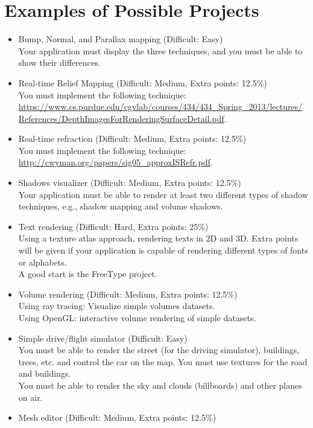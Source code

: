 \documentclass[11pt]{article}
\begin{document}
\section{Examples of Possible Projects}
\begin{itemize}
\item Bump, Normal, and Parallax mapping (Difficult: Easy)\\
Your application must display the three techniques, and you must be able to show their differences.
\item Real-time Relief Mapping (Difficult: Medium, Extra points: 12.5\%)\\
You must implement the following technique: \url{https://www.cs.purdue.edu/cgvlab/courses/434/434_Spring_2013/lectures/References/DepthImagesForRenderingSurfaceDetail.pdf}.
\item Real-time refraction (Difficult: Medium, Extra points: 12.5\%)\\
You must implement the following technique: \url{http://cwyman.org/papers/sig05_approxISRefr.pdf}.
\item Shadows visualizer (Difficult: Medium, Extra points: 12.5\%)\\
Your application must be able to render at least two different types of shadow techniques, e.g., shadow mapping and volume shadows. 
\item Text rendering (Difficult: Hard, Extra points: 25\%)\\
Using a texture atlas approach, rendering texts in 2D and 3D. Extra points will be given if your application is capable of rendering different types of fonts or alphabets.\\
A good start is the FreeType project.
\item Volume rendering (Difficult: Medium, Extra points: 12.5\%)\\
Using ray tracing: Visualize simple volumes datasets.\\
Using OpenGL: interactive volume rendering of simple datasets.\\
\item Simple drive/flight simulator (Difficult: Easy)\\
You must be able to render the street (for the driving simulator), buildings, trees, etc. and control the car on the map. You must use textures for the road and buildings.\\
You must be able to render the sky and clouds (billboards) and other planes on air.
\item Mesh editor (Difficult: Medium, Extra points: 12.5\%)\\

\end{itemize}
\end{document}
